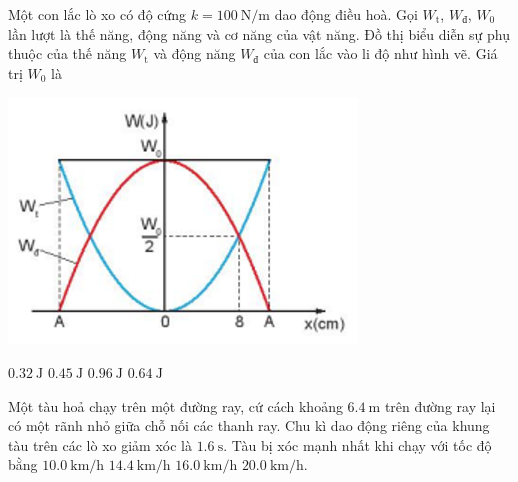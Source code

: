 \begin{ex}
Một con lắc lò xo có độ cứng $k=\SI{100}{\newton/\meter}$ dao động điều hoà. Gọi $W_\text{t}$, $W_\text{đ}$, $W_0$ lần lượt là thế năng, động năng và cơ năng của vật năng. Đồ thị biểu diễn sự phụ thuộc của thế năng $W_\text{t}$ và động năng $W_\text{đ}$ của con lắc vào li độ như hình vẽ. Giá trị $W_0$ là
\begin{center}
	\includegraphics[width=0.4\linewidth]{../figs/C1-Q-6}
\end{center}	
	\choice
	{$\SI{0.32}{\joule}$}
	{$\SI{0.45}{\joule}$}
	{$\SI{0.96}{\joule}$}
	{\True $\SI{0.64}{\joule}$}
\end{ex}
\begin{ex}
Một tàu hoả chạy trên một đường ray, cứ cách khoảng $\SI{6.4}{\meter}$ trên đường ray lại có một rãnh nhỏ giữa chỗ nối các thanh ray. Chu kì dao động riêng của khung tàu trên các lò xo giảm xóc là $\SI{1.6}{\second}$. Tàu bị xóc mạnh nhất khi chạy với tốc độ bằng	
	\choice
	{$\SI{10.0}{\kilo\meter/\hour}$}
	{\True $\SI{14.4}{\kilo\meter/\hour}$}
	{$\SI{16.0}{\kilo\meter/\hour}$}
	{$\SI{20.0}{\kilo\meter/\hour}$.}
\end{ex}
